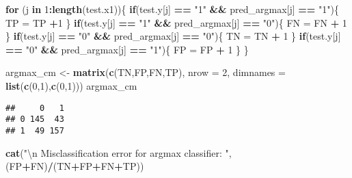 \documentclass[]{article}
\newenvironment{Shaded}{\begin{snugshade}}{\end{snugshade}}
\newcommand{\KeywordTok}[1]{\textcolor[rgb]{0.13,0.29,0.53}{\textbf{#1}}}
\newcommand{\DataTypeTok}[1]{\textcolor[rgb]{0.13,0.29,0.53}{#1}}
\newcommand{\DecValTok}[1]{\textcolor[rgb]{0.00,0.00,0.81}{#1}}
\newcommand{\CharTok}[1]{\textcolor[rgb]{0.31,0.60,0.02}{#1}}
\newcommand{\StringTok}[1]{\textcolor[rgb]{0.31,0.60,0.02}{#1}}
\newcommand{\ControlFlowTok}[1]{\textcolor[rgb]{0.13,0.29,0.53}{\textbf{#1}}}
\newcommand{\OperatorTok}[1]{\textcolor[rgb]{0.81,0.36,0.00}{\textbf{#1}}}
\newcommand{\NormalTok}[1]{#1}
\begin{document}
\begin{Shaded}
\begin{Highlighting}[]
\ControlFlowTok{for}\NormalTok{ (j }\ControlFlowTok{in} \DecValTok{1}\OperatorTok{:}\KeywordTok{length}\NormalTok{(test.x1))\{}
  \ControlFlowTok{if}\NormalTok{(test.y[j] }\OperatorTok{==}\StringTok{ "1"} \OperatorTok{&&}\StringTok{ }\NormalTok{pred_argmax[j] }\OperatorTok{==}\StringTok{ "1"}\NormalTok{)\{}
\NormalTok{    TP =}\StringTok{ }\NormalTok{TP }\OperatorTok{+}\DecValTok{1}
\NormalTok{  \}}
  \ControlFlowTok{if}\NormalTok{(test.y[j] }\OperatorTok{==}\StringTok{ "1"} \OperatorTok{&&}\StringTok{ }\NormalTok{pred_argmax[j] }\OperatorTok{==}\StringTok{ "0"}\NormalTok{)\{}
\NormalTok{    FN =}\StringTok{ }\NormalTok{FN }\OperatorTok{+}\StringTok{ }\DecValTok{1}
\NormalTok{  \}}
  \ControlFlowTok{if}\NormalTok{(test.y[j] }\OperatorTok{==}\StringTok{ "0"} \OperatorTok{&&}\StringTok{ }\NormalTok{pred_argmax[j] }\OperatorTok{==}\StringTok{ "0"}\NormalTok{)\{}
\NormalTok{    TN =}\StringTok{ }\NormalTok{TN }\OperatorTok{+}\StringTok{ }\DecValTok{1}
\NormalTok{  \}}
  \ControlFlowTok{if}\NormalTok{(test.y[j] }\OperatorTok{==}\StringTok{ "0"} \OperatorTok{&&}\StringTok{ }\NormalTok{pred_argmax[j] }\OperatorTok{==}\StringTok{ "1"}\NormalTok{)\{}
\NormalTok{    FP =}\StringTok{ }\NormalTok{FP }\OperatorTok{+}\StringTok{ }\DecValTok{1}
\NormalTok{  \}}
\NormalTok{\}}

\NormalTok{argmax_cm <-}\StringTok{ }\KeywordTok{matrix}\NormalTok{(}\KeywordTok{c}\NormalTok{(TN,FP,FN,TP), }\DataTypeTok{nrow =} \DecValTok{2}\NormalTok{, }\DataTypeTok{dimnames =} \KeywordTok{list}\NormalTok{(}\KeywordTok{c}\NormalTok{(}\DecValTok{0}\NormalTok{,}\DecValTok{1}\NormalTok{),}\KeywordTok{c}\NormalTok{(}\DecValTok{0}\NormalTok{,}\DecValTok{1}\NormalTok{)))}
\NormalTok{argmax_cm}
\end{Highlighting}
\end{Shaded}

\begin{verbatim}
##     0   1
## 0 145  43
## 1  49 157
\end{verbatim}

\begin{Shaded}
\begin{Highlighting}[]
\KeywordTok{cat}\NormalTok{(}\StringTok{"}\CharTok{\textbackslash{}n}\StringTok{ Misclassification error for argmax classifier: "}\NormalTok{,(FP}\OperatorTok{+}\NormalTok{FN)}\OperatorTok{/}\NormalTok{(TN}\OperatorTok{+}\NormalTok{FP}\OperatorTok{+}\NormalTok{FN}\OperatorTok{+}\NormalTok{TP))}
\end{Highlighting}
\end{Shaded}
\end{document}
